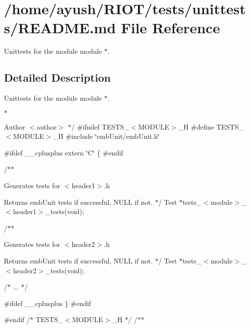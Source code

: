 \hypertarget{unittests_2README_8md}{}\section{/home/ayush/\+R\+I\+O\+T/tests/unittests/\+R\+E\+A\+D\+ME.md File Reference}
\label{unittests_2README_8md}


Unittests for the {\ttfamily module} module $\ast$.  




\subsection{Detailed Description}
Unittests for the {\ttfamily module} module $\ast$. 


\begin{DoxyItemize}
\item $\ast$ \begin{DoxyAuthor}{Author}
$<$author$>$ $\ast$/ \#ifndef T\+E\+S\+T\+S\+\_\+$<$\+M\+O\+D\+U\+L\+E$>$\+\_\+H \#define T\+E\+S\+T\+S\+\_\+$<$\+M\+O\+D\+U\+L\+E$>$\+\_\+H \#include \char`\"{}emb\+Unit/emb\+Unit.\+h\char`\"{}
\end{DoxyAuthor}
\#ifdef \+\_\+\+\_\+cplusplus extern \char`\"{}\+C\char`\"{} \{ \#endif
\end{DoxyItemize}

/$\ast$$\ast$
\begin{DoxyItemize}
\item Generates tests for $<$header1$>$.h
\item 
\item \begin{DoxyReturn}{Returns}
emb\+Unit tests if successful, N\+U\+LL if not. $\ast$/ Test $\ast$tests\+\_\+$<$module$>$\+\_\+$<$header1$>$\+\_\+tests(void);
\end{DoxyReturn}
/$\ast$$\ast$
\item Generates tests for $<$header2$>$.h
\item 
\item \begin{DoxyReturn}{Returns}
emb\+Unit tests if successful, N\+U\+LL if not. $\ast$/ Test $\ast$tests\+\_\+$<$module$>$\+\_\+$<$header2$>$\+\_\+tests(void);
\end{DoxyReturn}
/$\ast$ ... $\ast$/
\end{DoxyItemize}

\#ifdef \+\_\+\+\_\+cplusplus \} \#endif

\#endif /$\ast$ T\+E\+S\+T\+S\+\_\+$<$\+M\+O\+D\+U\+L\+E$>$\+\_\+H $\ast$/ /$\ast$$\ast$ 